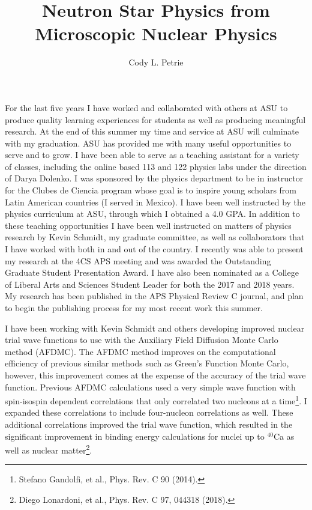 \documentclass[12pt]{article}
\title{\vspace{-2.0cm}Neutron Star Physics from Microscopic Nuclear Physics}
\author{Cody L. Petrie}
\date{}
\begin{document}
\maketitle

For the last five years I have worked and collaborated with others at ASU to produce quality learning experiences for students as well as producing meaningful research. At the end of this summer my time and service at ASU will culminate with my graduation. ASU has provided me with many useful opportunities to serve and to grow. I have been able to serve as a teaching assistant for a variety of classes, including the online based 113 and 122 physics labs under the direction of Darya Dolenko. I was sponsored by the physics department to be in instructor for the Clubes de Ciencia program whose goal is to inspire young scholars from Latin American countries (I served in Mexico). I have been well instructed by the physics curriculum at ASU, through which I obtained a 4.0 GPA. In addition to these teaching opportunities I have been well instructed on matters of physics research by Kevin Schmidt, my graduate committee, as well as collaborators that I have worked with both in and out of the country. I recently was able to present my research at the 4CS APS meeting and was awarded the Outstanding Graduate Student Presentation Award. I have also been nominated as a College of Liberal Arts and Sciences Student Leader for both the 2017 and 2018 years. My research has been published in the APS Physical Review C journal, and plan to begin the publishing process for my most recent work this summer.

I have been working with Kevin Schmidt and others developing improved nuclear trial wave functions to use with the Auxiliary Field Diffusion Monte Carlo method (AFDMC). The AFDMC method improves on the computational efficiency of previous similar methods such as Green's Function Monte Carlo, however, this improvement comes at the expense of the accuracy of the trial wave function. Previous AFDMC calculations used a very simple wave function with spin-isospin dependent correlations that only correlated two nucleons at a time\footnote{Stefano Gandolfi, et al., Phys. Rev. C 90 (2014).}. I expanded these correlations to include four-nucleon correlations as well. These additional correlations improved the trial wave function, which resulted in the significant improvement in binding energy calculations for nuclei up to $^{40}$Ca as well as nuclear matter\footnote{Diego Lonardoni, et al., Phys. Rev. C 97, 044318 (2018).}.
\end{document}
